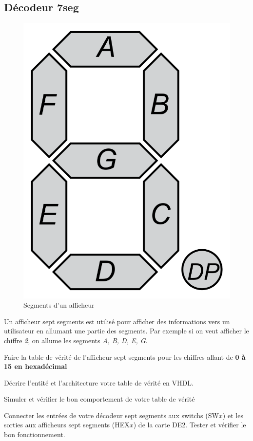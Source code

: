 \subsection{Décodeur 7seg}
\begin{figure}[ht]
    \centering
    \includegraphics[scale = 0.1]{img/SevenSegDisplay.png}
    \caption{Segments d'un afficheur}
\end{figure}

Un afficheur sept segments est utilisé pour afficher des informations vers un utilisateur en allumant une partie des segments. Par exemple si on veut afficher le chiffre \textit{2}, on allume les segments \textit{A, B, D, E, G}.

\medskip

Faire la table de vérité de l'afficheur sept segments pour les chiffres allant de \textbf{0 à 15 en hexadécimal}

\medskip

Décrire l'entité et l'architecture votre table de vérité en VHDL.

\medskip

Simuler et vérifier le bon comportement de votre table de vérité

\medskip

Connecter les entrées de votre décodeur sept segments aux switchs (SW$x$) et les sorties aux afficheurs sept segments (HEX$x$) de la carte DE2. Tester et vérifier le bon fonctionnement.
